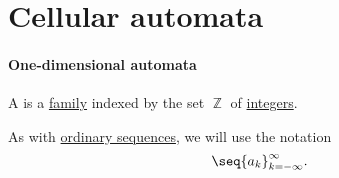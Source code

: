 \section{Cellular automata}\label{sec:cellular_automata}

\paragraph{One-dimensional automata}

\begin{definition}\label{def:doubly_infinite_sequence}
  A  is a \hyperref[def:indexed_family]{family} indexed by the set \( \BbbZ \) of \hyperref[def:integers]{integers}.

  As with \hyperref[def:sequence]{ordinary sequences}, we will use the notation
  \begin{equation*}
    \seq{ a_k }_{k=-\infty}^\infty.
  \end{equation*}
\end{definition}
